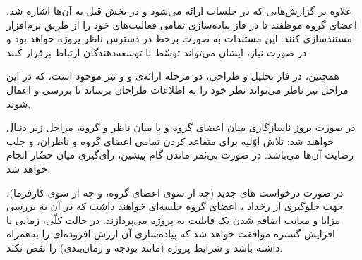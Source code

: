علاوه بر گزارش‌هایی که در جلسات ارائه می‌شود و در بخش قبل به آن‌ها اشاره شد، اعضای گروه موظفند تا در فاز پیاده‌سازی تمامی فعالیت‌های خود را از طریق نرم‌افزار  مستندسازی کنند. این مستندات به صورت برخط در دسترس ناظر پروژه خواهد بود و در صورت نیاز، ایشان می‌تواند توسّط  با توسعه‌دهندگان ارتباط برقرار کنند.

همچنین، در فاز تحلیل و طراحی، دو مرحله ارائه‌ی  و  و  نیز موجود است، که در این مراحل نیز ناظر می‌تواند نظر خود را به اطلاعات طراحان برساند تا بررسی و اعمال شوند.

در صورت بروز ناسازگاری میان اعضای گروه و یا میان ناظر و گروه، مراحل زیر دنبال خواهند شد:
 تلاش اوّلیه برای متقاعد کردن تمامی اعضای گروه و ناظران، و جلب رضایت آن‌ها می‌باشد.
 در صورت بی‌ثمر ماندن گام پیشین، رأی‌گیری میان حضّار انجام خواهد شد.

در صورت درخواست های جدید (چه از سوی اعضای گروه، و چه از سوی کارفرما)، جهت جلوگیری از رخداد ، اعضای گروه جلسه‌ای خواهند داشت که در آن به بررسی مزایا و معایب اضافه شدن یک قابلیت به پروژه می‌پردازند. در حالت کلّی، زمانی با افزایش گستره موافقت خواهد شد که پیاده‌سازی آن ارزش افزوده‌ای را به‌همراه داشته باشد و شرایط پروژه (مانند بودجه و زمان‌بندی) را نقض نکند.

